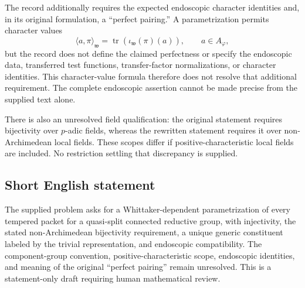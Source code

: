 \documentclass[11pt]{article}
\begin{document}
The record additionally requires the expected endoscopic character identities and, in its original formulation, a ``perfect pairing.'' A parametrization permits character values
\[
\langle a,\pi\rangle_{\mathfrak w}
=\operatorname{tr}\!\left(\iota_{\mathfrak w}(\pi)(a)\right),
\qquad a\in A_\varphi,
\]
but the record does not define the claimed perfectness or specify the endoscopic data, transferred test functions, transfer-factor normalizations, or character identities. This character-value formula therefore does not resolve that additional requirement. The complete endoscopic assertion cannot be made precise from the supplied text alone.

There is also an unresolved field qualification: the original statement requires bijectivity over \(p\)-adic fields, whereas the rewritten statement requires it over non-Archimedean local fields. These scopes differ if positive-characteristic local fields are included. No restriction settling that discrepancy is supplied.
\subsection{Short English statement}
The supplied problem asks for a Whittaker-dependent parametrization of every tempered packet for a quasi-split connected reductive group, with injectivity, the stated non-Archimedean bijectivity requirement, a unique generic constituent labeled by the trivial representation, and endoscopic compatibility. The component-group convention, positive-characteristic scope, endoscopic identities, and meaning of the original ``perfect pairing'' remain unresolved. This is a statement-only draft requiring human mathematical review.
\end{document}
